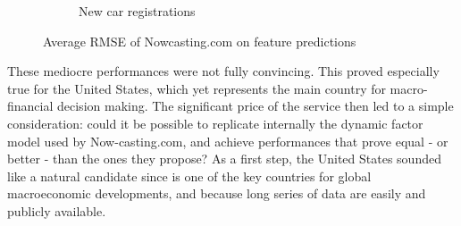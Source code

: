 \begin{figure} [H]
\begin{subfigure}[t]{0.43\textwidth}
		\caption{New car registrations}
	\end{subfigure}

	\caption{Average RMSE of Nowcasting.com on feature predictions}

	\label{fig_c2_s1_2}
\vspace{-3mm}
\end{figure}

These mediocre performances were not fully convincing. This proved especially true for the United States, which yet represents the main country for macro-financial decision making. The significant price of the service then led to a simple consideration: could it be possible to replicate internally the dynamic factor model used by Now-casting.com, and achieve performances that prove equal - or better - than the ones they propose? As a first step, the United States sounded like a natural candidate since is one of the key countries for global macroeconomic developments, and because long series of data are easily and publicly available.
